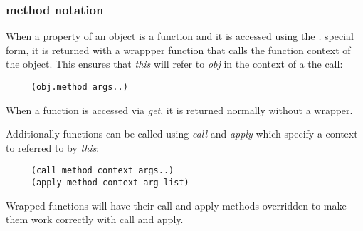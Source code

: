 \documentclass[11pt]{article}
\begin{document}
\subsubsection{method notation}
\label{sec-1.3.3}

    When a property of an object is a function and it is accessed
    using the \emph{.} special form, it is returned with a wrappper
    function that calls the function context of the object.  This
    ensures that \emph{this} will refer to \emph{obj} in the context of a the
    call:
    
\begin{verbatim}
     (obj.method args..)
\end{verbatim}

    
    When a function is accessed via \emph{get}, it is returned normally
    without a wrapper.
    
    Additionally functions can be called using \emph{call} and \emph{apply}
    which specify a context to referred to by \emph{this}:
    
\begin{verbatim}
     (call method context args..)
     (apply method context arg-list)
\end{verbatim}

    
    Wrapped functions will have their call and apply methods
    overridden to make them work correctly with call and apply.
\end{document}

